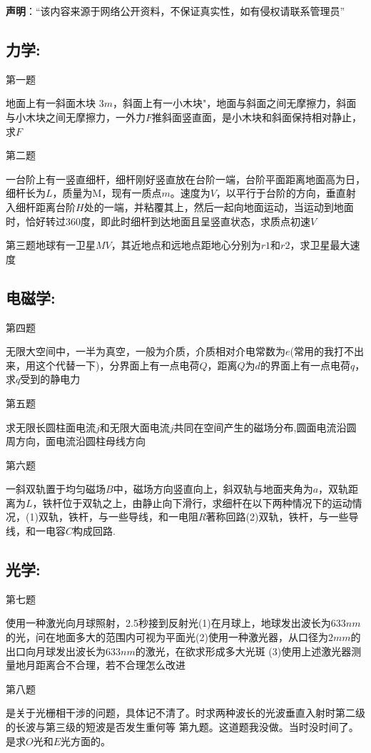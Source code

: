 
\textbf{声明}：“该内容来源于网络公开资料，不保证真实性，如有侵权请联系管理员”

\subsection{力学:}
第一题

地面上有一斜面木块 $3m$，斜面上有一小木块"，地面与斜面之间无摩擦力，斜面与小木块之间无摩擦力，一外力$F$推斜面竖直面，是小木块和斜面保持相对静止，求$F$

第二题

一台阶上有一竖直细杆，细杆刚好竖直放在台阶一端，台阶平面距离地面高为日，细杆长为$L$，质量为M，现有一质点$m$。速度为$V$，以平行于台阶的方向，垂直射入细杆距离台阶$H$处的一端，并粘覆其上，然后一起向地面运动，当运动到地面时，恰好转过360度，即此时细杆到达地面且呈竖直状态，求质点初速$V$

第三题地球有一卫星$MV$，其近地点和远地点距地心分别为$r1$和$r2$，求卫星最大速度
\subsection{电磁学:}
第四题

无限大空间中，一半为真空，一般为介质，介质相对介电常数为$e$(常用的我打不出来，用这个代替一下)，分界面上有一点电荷$Q$，距离$Q$为$d$的界面上有一点电荷$q$，求$q$受到的静电力

第五题

求无限长圆柱面电流$j$和无限大面电流$j$共同在空间产生的磁场分布,圆面电流沿圆周方向，面电流沿圆柱母线方向

第六题

一斜双轨置于均匀磁场$B$中，磁场方向竖直向上，斜双轨与地面夹角为$a$，双轨距离为$L$，铁杆位于双轨之上，由静止向下滑行，求细杆在以下两种情况下的运动情况，(1)双轨，铁杆，与一些导线，和一电阻$R$著称回路(2)双轨，铁杆，与一些导线，和一电容$C$构成回路.
\subsection{光学:}
第七题

使用一种激光向月球照射，2.5秒接到反射光(1)在月球上，地球发出波长为$633nm$的光，问在地面多大的范围内可视为平面光(2)使用一种激光器，从口径为$2mm$的出口向月球发出波长为$633nm$的激光，在欲求形成多大光斑
(3)使用上述激光器测量地月距离合不合理，若不合理怎么改进

第八题

是关于光栅相干涉的问题，具体记不清了。时求两种波长的光波垂直入射时第二级的长波与第三级的短波是否发生重何等
第九题。这道题我没做。当时没时间了。是求$O$光和$E$光方面的。